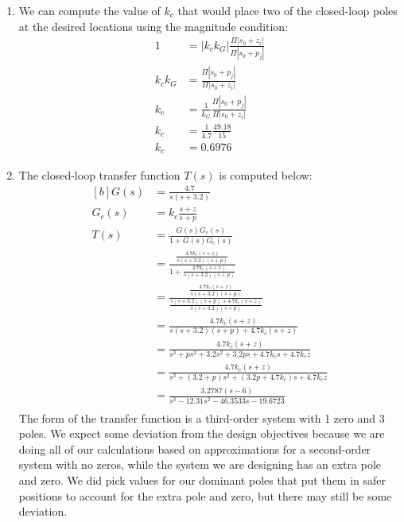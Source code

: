 \documentclass[12pt]{article}
\begin{document}
\begin{enumerate}
    \item %
    We can compute the value of $k_c$ that would place two of the closed-loop poles at the desired locations using the magnitude condition:
    \begin{equation*}
    \begin{aligned}
        1 &= |k_c k_G| \frac{\Pi |s_0 + z_i|}{\Pi |s_0 + p_j|} \\
        k_c k_G &= \frac{\Pi |s_0 + p_j|}{\Pi |s_0 + z_i|} \\
        k_c &= \frac{1}{k_G} \frac{\Pi |s_0 + p_j|}{\Pi |s_0 + z_i|} \\
        k_c &= \frac{1}{4.7} \frac{49.18}{15} \\
        k_c &= 0.6976
    \end{aligned}
    \end{equation*}

    \item %
    The closed-loop transfer function $T(s)$ is computed below:
    \begin{equation*}
    \begin{aligned}[b]
        G(s) &= \frac{4.7}{s(s + 3.2)} \\
        G_c(s) &= k_c\frac{s + z}{s + p} \\
        T(s) &= \frac{G(s)G_c(s)}{1 + G(s)G_c(s)} \\
        &= \frac{\frac{4.7 k_c (s + z)}{s(s + 3.2)(s + p)}}{1 + \frac{4.7 k_c (s + z)}{s(s + 3.2)(s + p)}} \\
        &= \frac{\frac{4.7 k_c (s + z)}{s(s + 3.2)(s + p)}}{\frac{s(s + 3.2)(s + p) + 4.7 k_c (s + z)}{s(s + 3.2)(s + p)}} \\
        &= \frac{4.7 k_c (s + z)}{s(s + 3.2)(s + p) + 4.7 k_c (s + z)} \\
        &= \frac{4.7 k_c (s + z)}{s^3 + ps^2 + 3.2s^2 + 3.2 p s + 4.7 k_c s + 4.7 k_c z} \\
        &= \frac{4.7 k_c (s + z)}{s^3 + (3.2 + p)s^2 + (3.2 p + 4.7 k_c)s + 4.7 k_c z} \\
        &= \frac{3.2787 (s - 6)}{s^3 - 12.31s^2 - 46.3533s - 19.6723} \\
    \end{aligned}
    \end{equation*}
    The form of the transfer function is a third-order system with 1 zero and 3 poles. We expect some deviation from the design objectives because we are doing all of our calculations based on approximations for a second-order system with no zeros, while the system we are designing has an extra pole and zero. We did pick values for our dominant poles that put them in safer positions to account for the extra pole and zero, but there may still be some deviation.


\end{enumerate}
\end{document}

